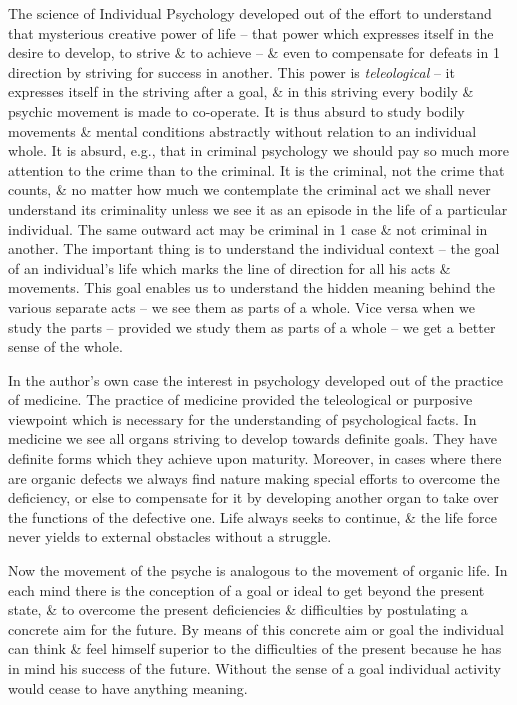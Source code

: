 \documentclass{article}
\numberwithin{equation}{section}
\begin{document}
The science of Individual Psychology developed out of the effort to understand that mysterious creative power of life -- that power which expresses itself in the desire to develop, to strive \& to achieve -- \& even to compensate for defeats in 1 direction by striving for success in another. This power is \textit{teleological} -- it expresses itself in the striving after a goal, \& in this striving every bodily \& psychic movement is made to co-operate. It is thus absurd to study bodily movements \& mental conditions abstractly without relation to an individual whole. It is absurd, e.g., that in criminal psychology we should pay so much more attention to the crime than to the criminal. It is the criminal, not the crime that counts, \& no matter how much we contemplate the criminal act we shall never understand its criminality unless we see it as an episode in the life of a particular individual. The same outward act may be criminal in 1 case \& not criminal in another. The important thing is to understand the individual context -- the goal of an individual's life which marks the line of direction for all his acts \& movements. This goal enables us to understand the hidden meaning behind the various separate acts -- we see them as parts of a whole. Vice versa when we study the parts -- provided we study them as parts of a whole -- we get a better sense of the whole.

In the author's own case the interest in psychology developed out of the practice of medicine. The practice of medicine provided the teleological or purposive viewpoint which is necessary for the understanding of psychological facts. In medicine we see all organs striving to develop towards definite goals. They have definite forms which they achieve upon maturity. Moreover, in cases where there are organic defects we always find nature making special efforts to overcome the deficiency, or else to compensate for it by developing another organ to take over the functions of the defective one. Life always seeks to continue, \& the life force never yields to external obstacles without a struggle.

Now the movement of the psyche is analogous to the movement of organic life. In each mind there is the conception of a goal or ideal to get beyond the present state, \& to overcome the present deficiencies \& difficulties by postulating a concrete aim for the future. By means of this concrete aim or goal the individual can think \& feel himself superior to the difficulties of the present because he has in mind his success of the future. Without the sense of a goal individual activity would cease to have anything meaning.
\end{document}
